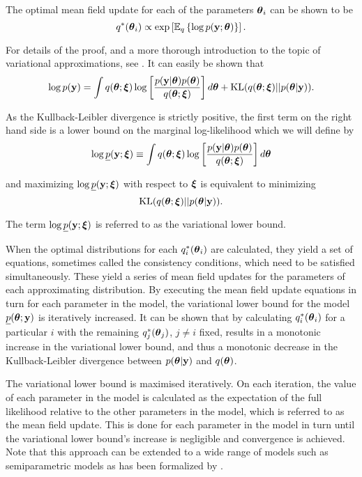 The optimal mean field update for each of the parameters ${\boldsymbol \theta}_i$ can be
shown to be
$$
	q^*({\boldsymbol \theta}_i) \propto \exp\left[ \mathbb{E}_q \left\{ \log p({\bf y}; {\boldsymbol \theta})\right\} \right].
$$

\noindent For details of the proof, and a more thorough introduction to the
topic of variational approximations, see \cite{Ormerod2010}. It can easily be
shown that
$$
	\displaystyle \log p({\bf y}) = \int q({\boldsymbol \theta};{\boldsymbol \xi}) \log \left[ \frac{p({\bf y}|{\boldsymbol \theta})p({\boldsymbol \theta})}{q({\boldsymbol \theta};{\boldsymbol \xi})} \right] d{\boldsymbol \theta} + \text{KL}(q({\boldsymbol \theta};{\boldsymbol \xi})||p({\boldsymbol \theta}|{\bf y})).
$$

\noindent As the Kullback-Leibler divergence is strictly positive, the first
term on the right hand side is a lower bound on the marginal log-likelihood
which we will define by
$$
	\displaystyle \log \underline{p}({\bf y};{\boldsymbol \xi}) \equiv \int q({\boldsymbol \theta};{\boldsymbol \xi})  \log \left[ \frac{p({\bf y}|{\boldsymbol \theta})p({\boldsymbol \theta})}{q({\boldsymbol \theta};{\boldsymbol \xi})} \right] d{\boldsymbol \theta}
$$

\noindent and maximizing $\log \underline{p}({\bf y};{\boldsymbol \xi})$ with respect to ${\boldsymbol \xi}$
is equivalent to minimizing $$\text{KL}(q({\boldsymbol \theta};{\boldsymbol \xi})||p({\boldsymbol \theta}|{\bf y})).
$$

\noindent  The term $\log
\underline{p}({\bf y};{\boldsymbol \xi})$ is referred to as the variational lower bound.

When the optimal distributions for each $q_i^*({\boldsymbol \theta}_i)$ are calculated, they
yield a set of equations, sometimes called the consistency conditions, which
need to be  satisfied simultaneously. These yield a series of mean field updates
for the parameters of each approximating distribution. By executing the mean
field update equations in turn for each parameter in the model, the variational
lower bound for the model $\underline{p}({\boldsymbol \theta}; {\bf y})$ is iteratively
increased. It can be shown that by calculating $q_i^*({\boldsymbol \theta}_i)$ for  a
particular $i$ with the remaining $q_j^*({\boldsymbol \theta}_j)$, $j\ne i$ fixed, results in
a monotonic increase in the variational lower bound, and thus a monotonic
decrease in the Kullback-Leibler divergence between $p({\boldsymbol \theta}|{\bf y})$ and
$q({\boldsymbol \theta})$.

The variational lower bound is maximised iteratively. On each iteration, the
value of each parameter in the model is calculated as the expectation of the
full likelihood relative to the other parameters in the model, which is
referred to as the mean field update. This is done for each parameter in the
model in turn until the variational lower bound's increase is negligible and
convergence is achieved. Note that this approach can be extended to a wide
range of models such as semiparametric models as has been formalized by
\cite{Rohde2015}.

